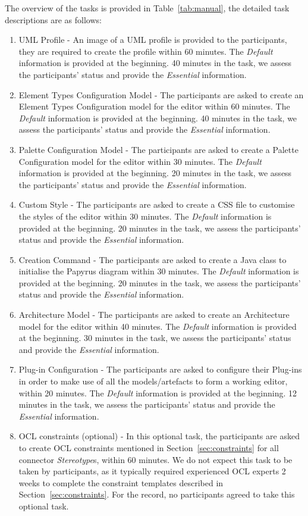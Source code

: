 The overview of the tasks is provided in Table~\ref{tab:manual}, the detailed task descriptions are as follows:
\begin{enumerate}
	\item UML Profile - An image of a UML profile is provided to the participants, they are required to create the profile within 60 minutes.
	The \textit{Default} information is provided at the beginning. 
	40 minutes in the task, we assess the participants' status and provide the \textit{Essential} information.
	\item Element Types Configuration Model - The participants are asked to create an Element Types Configuration model for the editor within 60 minutes. 
	The \textit{Default} information is provided at the beginning. 
	40 minutes in the task, we assess the participants' status and provide the \textit{Essential} information.
	\item Palette Configuration Model - The participants are asked to create a Palette Configuration model for the editor within 30 minutes.
	The \textit{Default} information is provided at the beginning. 
	20 minutes in the task, we assess the participants' status and provide the \textit{Essential} information.
	\item Custom Style - The participants are asked to create a CSS file to customise the styles of the editor within 30 minutes.
	The \textit{Default} information is provided at the beginning. 
	20 minutes in the task, we assess the participants' status and provide the \textit{Essential} information.
	\item Creation Command - The participants are asked to create a Java class to initialise the Papyrus diagram within 30 minutes.
	The \textit{Default} information is provided at the beginning. 
	20 minutes in the task, we assess the participants' status and provide the \textit{Essential} information.
	\item Architecture Model - The participants are asked to create an Architecture model for the editor within 40 minutes.
	The \textit{Default} information is provided at the beginning. 
	30 minutes in the task, we assess the participants' status and provide the \textit{Essential} information.
	\item Plug-in Configuration - The participants are asked to configure their Plug-ins in order to make use of all the models/artefacts to form a working editor, within 20 minutes.
	The \textit{Default} information is provided at the beginning. 
	12 minutes in the task, we assess the participants' status and provide the \textit{Essential} information.
	\item OCL constraints (optional) - In this optional task, the participants are asked to create OCL constraints mentioned in Section~\ref{sec:constraints} for all connector \textit{Stereotype}s, within 60 minutes. 
	We do not expect this task to be taken by participants, as it typically required experienced OCL experts 2 weeks to complete the constraint templates described in Section~\ref{sec:constraints}.
	For the record, no participants agreed to take this optional task.
\end{enumerate}

